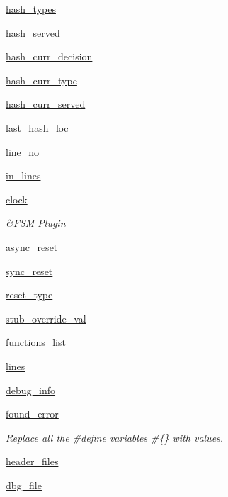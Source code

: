 \begin{DoxyCompactItemize}
\item 
\hyperlink{classsrc_1_1codegen_1_1codegen_a7d558f65ce1c06aac95ff81ccf6d7c56}{hash\-\_\-types}
\item 
\hyperlink{classsrc_1_1codegen_1_1codegen_aeb496fa242e02add6763b1231c8d0d6b}{hash\-\_\-served}
\item 
\hyperlink{classsrc_1_1codegen_1_1codegen_acd0bbf5623e10244e004795c4d6c9864}{hash\-\_\-curr\-\_\-decision}
\item 
\hyperlink{classsrc_1_1codegen_1_1codegen_ac52d0ff2519dcd3e385ec3f935dcef12}{hash\-\_\-curr\-\_\-type}
\item 
\hyperlink{classsrc_1_1codegen_1_1codegen_a4694bff348e2ec720f070f5a00a7627b}{hash\-\_\-curr\-\_\-served}
\item 
\hyperlink{classsrc_1_1codegen_1_1codegen_a8f9a4a6acf2e5f4fcc0043f0e336038c}{last\-\_\-hash\-\_\-loc}
\item 
\hyperlink{classsrc_1_1codegen_1_1codegen_aa67c1b409ff5dc21b0b29d4fd3d988a8}{line\-\_\-no}
\item 
\hyperlink{classsrc_1_1codegen_1_1codegen_a3e981982a203117a89f0216220ef35e2}{in\-\_\-lines}
\item 
\hyperlink{classsrc_1_1codegen_1_1codegen_a44287f529d387856ea12616f732da4a5}{clock}
\begin{DoxyCompactList}\small\item\em \&F\-S\-M Plugin \end{DoxyCompactList}\item 
\hyperlink{classsrc_1_1codegen_1_1codegen_ab571c5a0ed4af1f6549139c176f81ba8}{async\-\_\-reset}
\item 
\hyperlink{classsrc_1_1codegen_1_1codegen_a0dd09f1e941ca7d548ea6a62f4700b12}{sync\-\_\-reset}
\item 
\hyperlink{classsrc_1_1codegen_1_1codegen_ab41ce0ced866deb9f87c24ec402bb038}{reset\-\_\-type}
\item 
\hyperlink{classsrc_1_1codegen_1_1codegen_acbf0d11c53c3622ca9882109a9426f47}{stub\-\_\-override\-\_\-val}
\item 
\hyperlink{classsrc_1_1codegen_1_1codegen_aadf9a8ccf3c2cfbe223263585df2c595}{functions\-\_\-list}
\item 
\hyperlink{classsrc_1_1codegen_1_1codegen_a273a52ad4514be187aa19a8d2a680af1}{lines}
\item 
\hyperlink{classsrc_1_1codegen_1_1codegen_a2c0f2e58bab2bee51d4bd29101cdc68f}{debug\-\_\-info}
\item 
\hyperlink{classsrc_1_1codegen_1_1codegen_a255b1b73758f8a9f1e6a2fe555f9f6f8}{found\-\_\-error}
\begin{DoxyCompactList}\small\item\em Replace all the \#define variables \#\{{\itshape \} with values. }\end{DoxyCompactList}\item 
\hyperlink{classsrc_1_1codegen_1_1codegen_ab99ac25e057b9cc6007f411d7f7bb586}{header\-\_\-files}
\item 
\hyperlink{classsrc_1_1codegen_1_1codegen_ab37d0cfef8135e7c4be46e1592a8ca06}{dbg\-\_\-file}
\end{DoxyCompactItemize}


